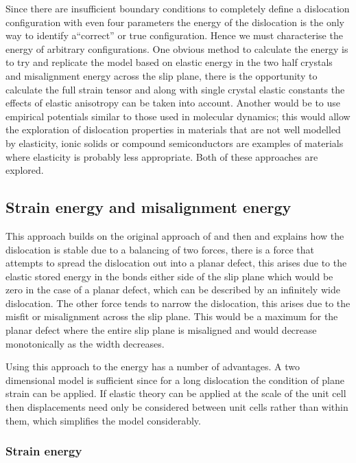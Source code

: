 Since there are insufficient boundary conditions to completely define a dislocation configuration with even four parameters the energy of the dislocation is the only way to identify a``correct'' or true configuration. Hence we must characterise the energy of arbitrary configurations. One obvious method to calculate the energy is to try and replicate the model based on elastic energy in the two half crystals and misalignment energy across the slip plane, there is the opportunity to calculate the full strain tensor and along with single crystal elastic constants the effects of elastic anisotropy can be taken into account. Another would be to use empirical potentials similar to those used in molecular dynamics; this would allow the exploration of dislocation properties in materials that are not well modelled by elasticity, ionic solids or compound semiconductors are examples of materials where elasticity is probably less appropriate. Both of these approaches are explored.

\subsection{Strain energy and misalignment energy}

This approach builds on the original approach of \citet{Peierls1940} and then \citet{Nabarro1947} and explains how the dislocation is stable due to a balancing of two forces, there is a force that attempts to spread the dislocation out into a planar defect, this arises due to the elastic stored energy in the bonds either side of the slip plane which would be zero in the case of a planar defect, which can be described by an infinitely wide dislocation. The other force tends to narrow the dislocation, this arises due to the misfit or misalignment across the slip plane. This would be a maximum for the planar defect where the entire slip plane is misaligned and would decrease monotonically as the width decreases.

Using this approach to the energy has a number of advantages. A two dimensional model is sufficient since for a long dislocation the condition of plane strain can be applied. If elastic theory can be applied at the scale of the unit cell then displacements need only be considered between unit cells rather than within them, which simplifies the model considerably.

\subsubsection{Strain energy}

